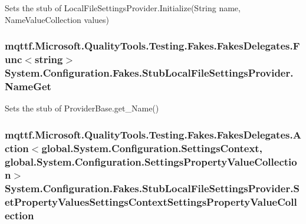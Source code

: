 Sets the stub of Local\-File\-Settings\-Provider.\-Initialize(\-String name, Name\-Value\-Collection values)

\hypertarget{class_system_1_1_configuration_1_1_fakes_1_1_stub_local_file_settings_provider_aa420bf64b7aa934991da261df8ff0ac3}{
\subsubsection[{Name\-Get}]{\setlength{\rightskip}{0pt plus 5cm}mqttf.\-Microsoft.\-Quality\-Tools.\-Testing.\-Fakes.\-Fakes\-Delegates.\-Func$<$string$>$ System.\-Configuration.\-Fakes.\-Stub\-Local\-File\-Settings\-Provider.\-Name\-Get}}\label{class_system_1_1_configuration_1_1_fakes_1_1_stub_local_file_settings_provider_aa420bf64b7aa934991da261df8ff0ac3}


Sets the stub of Provider\-Base.\-get\-\_\-\-Name()

\hypertarget{class_system_1_1_configuration_1_1_fakes_1_1_stub_local_file_settings_provider_a586edf4e1391ca3f30e791f926e0eab3}{
\subsubsection[{Set\-Property\-Values\-Settings\-Context\-Settings\-Property\-Value\-Collection}]{\setlength{\rightskip}{0pt plus 5cm}mqttf.\-Microsoft.\-Quality\-Tools.\-Testing.\-Fakes.\-Fakes\-Delegates.\-Action$<$global.\-System.\-Configuration.\-Settings\-Context, global.\-System.\-Configuration.\-Settings\-Property\-Value\-Collection$>$ System.\-Configuration.\-Fakes.\-Stub\-Local\-File\-Settings\-Provider.\-Set\-Property\-Values\-Settings\-Context\-Settings\-Property\-Value\-Collection}}\label{class_system_1_1_configuration_1_1_fakes_1_1_stub_local_file_settings_provider_a586edf4e1391ca3f30e791f926e0eab3}


